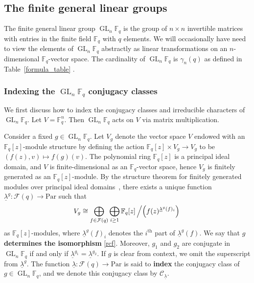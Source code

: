 \documentclass[Unicode,ALCO]{cedram}
\DeclareMathOperator{\GL}{GL}
\newcommand{\CC}{\mathcal{C}}
\newcommand{\F}{\mathbb{F}}
\newcommand{\CF}{\mathcal{F}}
\newcommand{\isom}{\cong}
\newcommand{\myemph}{\textbf}
\newcommand{\Par}{\text{Par}}
\newcommand{\ulambda}{{\underline{\lambda}}}
\begin{document}
\subsection{The finite general linear groups}

The finite general linear group \(\GL_n \F_q\) is the group of \(n \times n\) invertible matrices with entries in the finite field \(\F_q\) with \(q\) elements.
We will occasionally have need to view the elements of \(\GL_n \F_q\) abstractly as linear transformations on an \(n\)-dimensional \(\F_q\)-vector space.
The cardinality of \(\GL_n \F_q\) is \(\gamma_n(q)\) as defined in Table~\ref{formula_table} \cite[Proposition~1.10.1]{EC1}.

\subsubsection{Indexing the \(\GL_n \F_q\) conjugacy classes} \label{indexing}

We first discuss how to index the conjugacy classes and irreducible characters of $\GL_n \F_q$.
Let $V = \F_q^n$.
Then $\GL_n \F_q$ acts on $V$ via matrix multiplication.

Consider a fixed $g \in \GL_n \F_q$.
Let \(V_g\) denote the vector space $V$ endowed with an $\F_q [z]$-module structure by defining the action $\F_q [z] \times V_g \to V_g$ to be $(f(z), v) \mapsto f(g)(v)$.
The polynomial ring $\F_q[z]$ is a principal ideal domain, and $V$ is finite-dimensional as an $\F_q$-vector space, hence $V_g$ is finitely generated as an $\F_q[z]$-module.
By the structure theorem for finitely generated modules over principal ideal domains~\cite[Theorem~12.1.6]{DF}, there exists a unique function $\ulambda^g : \CF (q) \to \Par$ such that
\begin{equation} \label{rcf}
V_g \isom \bigoplus_{f \in \CF (q)} \bigoplus_{i \geq 1} \F_q [z] \left / \left ( f(z)^{\ulambda^g (f)_i} \right ) \right .
\end{equation}
as $\F_q [z]$-modules,
where $\ulambda^g (f)_i$ denotes the $i^\text{th}$ part of $\ulambda ^g (f)$.
We say that \(g\) \myemph{determines the isomorphism} \eqref{rcf}.
Moreover, \(g_1\) and \(g_2\) are conjugate in \(\GL_n \F_q\) if and only if \(\ulambda^{g_1} = \ulambda^{g_2}\).
If \(g\) is clear from context, we omit the superscript from \(\ulambda^g\).
The function $\ulambda : \CF (q) \to \Par$ is said to \myemph{index} the conjugacy class of $g \in \GL_n \F_q$,
and we denote this conjugacy class by \(\CC_\ulambda\).
\end{document}
